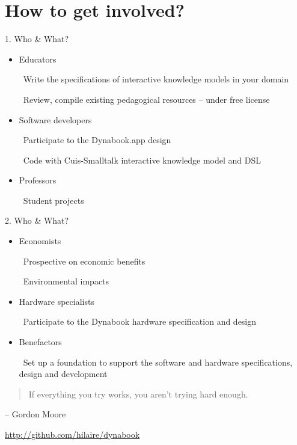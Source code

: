 \documentclass{beamer}
\newcommand{\tip}{\boldmath{\textcolor{red}{$\Rightarrow$}}}
\begin{document}
\section{How to get involved?}
\begin{frame}{1. Who \& What?}
  \begin{itemize}
  \item Educators

    \tip\ Write the specifications of interactive knowledge models in
    your domain

    \tip\ Review, compile existing pedagogical resources -- under free
    license
  \vspace*{10pt}

  \item Software developers

    \tip\ Participate to the Dynabook.app design
    
    \tip\ Code with Cuis-Smalltalk interactive knowledge model and DSL
  \vspace*{10pt}
    
  \item Professors

    \tip\ Student projects
  \end{itemize}
\end{frame}
%
\begin{frame}{2. Who \& What?}
  \begin{itemize}
  \item Economists

    \tip\ Prospective on economic benefits

    \tip\ Environmental impacts
  \vspace*{10pt}

  \item Hardware specialists

    \tip\ Participate to the Dynabook hardware specification and
    design
  \vspace*{10pt}

  \item Benefactors

    \tip\ Set up a foundation to support the software and hardware
    specifications, design and development
    
  \end{itemize}
\end{frame}
%
\begin{frame}
  \begin{quote}
    If everything you try works, you aren't trying hard enough.
      \end{quote}
  \begin{flushright}
    -- Gordon Moore
  \end{flushright}
  \begin{center}
    \url{http://github.com/hilaire/dynabook}
  \end{center}
\end{frame}
\end{document}
